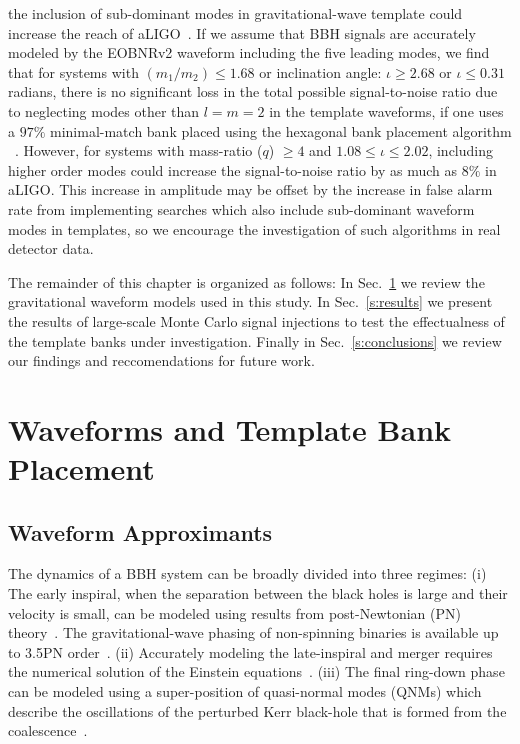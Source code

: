 the inclusion of sub-dominant modes in gravitational-wave template could
increase the reach of aLIGO~\cite{McKechan:2011ps,Pekowsky:2012sr}. If we
assume that BBH signals are accurately modeled by the EOBNRv2 waveform
including the five leading modes, we find that for systems with $(m_1/m_2)\leq
1.68$ or inclination angle: $\iota \geq 2.68$ or $\iota \leq 0.31$ radians, 
there is no significant loss in the total possible signal-to-noise ratio
due to neglecting modes other than $l = m = 2$ in the template waveforms,
if one uses a $97\%$ minimal-match bank placed using the hexagonal bank placement
algorithm ~\cite{SathyaBankPlacementTauN,BabaketalBankPlacement,SathyaMetric2PN,Cokelaer:2007kx}.
However, for systems with mass-ratio ($q$) $\geq 4$ and $1.08\leq\iota\leq 2.02$, including higher order modes could increase
the signal-to-noise ratio by as much as $8\%$ in aLIGO. This increase in
amplitude may be offset by the increase in false alarm rate from implementing
searches which also include sub-dominant waveform modes in templates, so we encourage the 
investigation of such algorithms in real detector data.

The remainder of this chapter is organized as follows: In Sec.~\ref{s:waveforms}
we review the gravitational waveform models used in this study. In
Sec.~\ref{s:results} we present the results of large-scale Monte Carlo signal
injections to test the effectualness of the template banks under
investigation. Finally in Sec.~\ref{s:conclusions} we review our findings and
reccomendations for future work.

\section{Waveforms and Template Bank Placement}
\label{s:waveforms}
\subsection{Waveform Approximants}
The dynamics of a BBH system can be broadly divided into three regimes: (i) The 
early inspiral, when the separation between the black holes is large and their
velocity is small, can be modeled
using results from post-Newtonian (PN)
theory~\cite{PNtheoryLivingReviewBlanchet}. The gravitational-wave phasing of
non-spinning binaries is available up to 3.5PN
order~\cite{PNFluxEnergy3PN01,PNFluxEnergy3PN02,Jaranowski:1999qd,Jaranowski:1999ye,Damour:2001bu,KidderPN,Blanchet3PN}.
(ii) Accurately modeling the late-inspiral and merger requires the numerical
solution of the Einstein
equations~\cite{Pretorius2005,Pretorius2006,BBHNRScheel,BBHNRGonzalezq10,BBHNRPollney,BBHNRLoustoq10,Buchman:2012dw}.
(iii) The final ring-down phase can be modeled using a super-position of
quasi-normal modes (QNMs) which describe the oscillations of the perturbed Kerr
black-hole that is formed from the
coalescence~\cite{BHRDQNMs,BHPTMinoSasaki}. 


